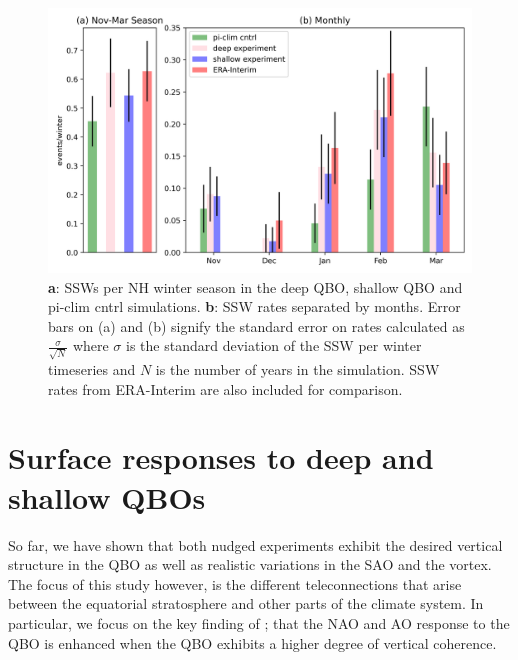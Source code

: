 \begin{figure}[h!]
\begin{center}
\noindent\includegraphics[width = 0.8\linewidth]{Figures/Figures-deepQBO/SSW_hist.png}
\caption[SSWs per NH winter season in QBO experiments]{\textbf{a}: SSWs per NH winter season in the deep QBO, shallow QBO and pi-clim cntrl simulations. \textbf{b}: SSW rates separated by months. Error bars on (a) and (b) signify the standard error on rates calculated as $\frac{\sigma}{\sqrt{N}}$ where $\sigma$ is the standard deviation of the SSW per winter timeseries and $N$ is the number of years in the simulation. SSW rates from ERA-Interim are also included for comparison.}
\label{fig:SSW_histogram_experiments}
\end{center}
\end{figure}

\newpage

\section{Surface responses to deep and shallow QBOs}
\label{sec:MSLP_responses}
So far, we have shown that both nudged experiments exhibit the desired vertical structure in the QBO as well as realistic variations in the SAO and the vortex. The focus of this study however, is the different teleconnections that arise between the equatorial stratosphere and other parts of the climate system. In particular, we focus on the key finding of \cite{andrewsObserved2019d}; that the NAO and AO response to the QBO is enhanced when the QBO exhibits a higher degree of vertical coherence. 

